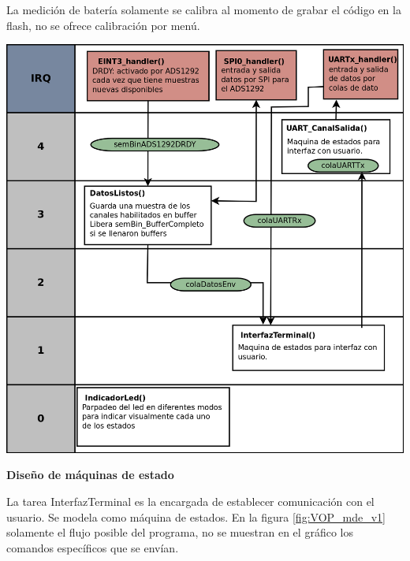 \begin{itemize}
La medición de batería solamente se calibra al momento de grabar el código en la flash, no se ofrece calibración por menú.

\begin{adjustbox}{center,caption={Diagrama de tareas en modo configuración},label={fig:VOP24_tareas_v1_configuracion},nofloat=figure,vspace=\bigskipamount}
\includegraphics[scale = 0.2]{./Figures/VOP24_tareas_v1_configuracion.png}
\end{adjustbox}

\end{itemize}

\textbf{Diseño de máquinas de estado}

La tarea InterfazTerminal es la encargada de establecer comunicación con el usuario. Se modela como máquina de estados. En la figura \ref{fig:VOP_mde_v1} solamente el flujo posible del programa, no se muestran en el gráfico los comandos específicos que se envían.


